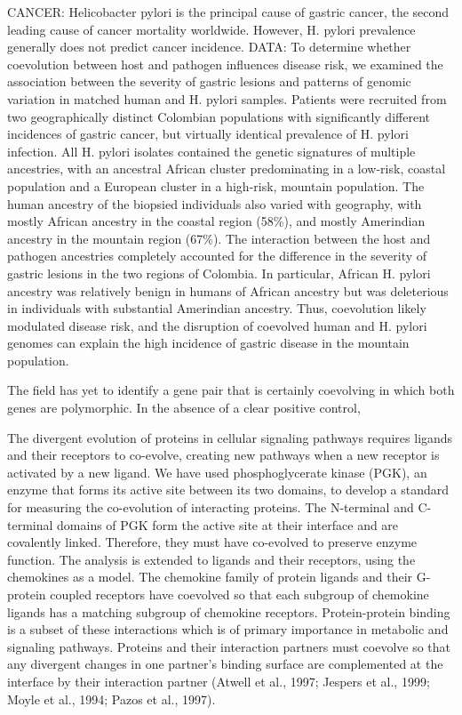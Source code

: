 CANCER: Helicobacter pylori is the principal cause of gastric cancer, the second leading cause of cancer mortality worldwide. However, H. pylori prevalence generally does not predict cancer incidence.			 \cite{kodaman2014human}
DATA: To determine whether coevolution between host and pathogen influences disease risk, we examined the association between the severity of gastric lesions and patterns of genomic variation in matched human and H. pylori samples. Patients were recruited from two geographically distinct Colombian populations with significantly different incidences of gastric cancer, but virtually identical prevalence of H. pylori infection.  \cite{kodaman2014human}
All H. pylori isolates contained the genetic signatures of multiple ancestries, with an ancestral African cluster predominating in a low-risk, coastal population and a European cluster in a high-risk, mountain population. The human ancestry of the biopsied individuals also varied with geography, with mostly African ancestry in the coastal region (58\%), and mostly Amerindian ancestry in the mountain region (67\%).  \cite{kodaman2014human}
The interaction between the host and pathogen ancestries completely accounted for the difference in the severity of gastric lesions in the two regions of Colombia. In particular, African H. pylori ancestry was relatively benign in humans of African ancestry but was deleterious in individuals with substantial Amerindian ancestry. \cite{kodaman2014human}
Thus, coevolution likely modulated disease risk, and the disruption of coevolved human and H. pylori genomes can explain the high incidence of gastric disease in the mountain population. \cite{kodaman2014human}

The field has yet to identify a gene pair that is certainly coevolving in which both genes are polymorphic. In the absence of a clear positive control, \cite{rohlfs2010detecting}

The divergent evolution of proteins in cellular signaling pathways requires ligands and their receptors to co-evolve, creating new pathways when a new receptor is activated by a new ligand. \cite{goh2000co}
We have used phosphoglycerate kinase (PGK), an enzyme that forms its active site between its two domains, to develop a standard for measuring the co-evolution of interacting proteins. \cite{goh2000co}
The N-terminal and C-terminal domains of PGK form the active site at their interface and are covalently linked. Therefore, they must have co-evolved to preserve enzyme function. \cite{goh2000co}
The analysis is extended to ligands and their receptors, using the chemokines as a model.  \cite{goh2000co}
The chemokine family of protein ligands and their G-protein coupled receptors have coevolved so that each subgroup of chemokine ligands has a matching subgroup of chemokine receptors. \cite{goh2000co}
Protein-protein binding is a subset of these interactions which is of primary importance in metabolic and signaling pathways. \cite{goh2000co}
Proteins and their interaction partners must coevolve so that any divergent changes in one partner's binding surface are complemented at the interface by their interaction partner (Atwell et al., 1997; Jespers et al., 1999; Moyle et al., 1994; Pazos et al., 1997). \cite{goh2000co}

